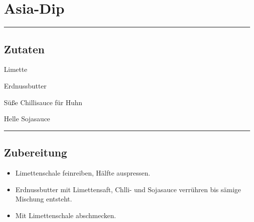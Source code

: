 \section*{Asia-Dip}

\bigbreak
\rule{\textwidth}{0.4pt}

\subsection*{Zutaten}

    \begin{description}[align=right,leftmargin=!,labelwidth=\widthof{\bfseries xxPrisen}]
        \item[1] Limette
        \item[5 EL] Erdnussbutter
        \item[*] Süße Chillisauce für Huhn
        \item[*] Helle Sojasauce
    \end{description}


\rule{\textwidth}{0.4pt}


\subsection*{Zubereitung}

\begin{itemize}
    \item Limettenschale feinreiben, Hälfte auspressen.
    \item Erdnussbutter mit Limettensaft, Chlli- und Sojasauce verrühren bis sämige Mischung entsteht.
    \item Mit Limettenschale abschmecken.
\end{itemize}

